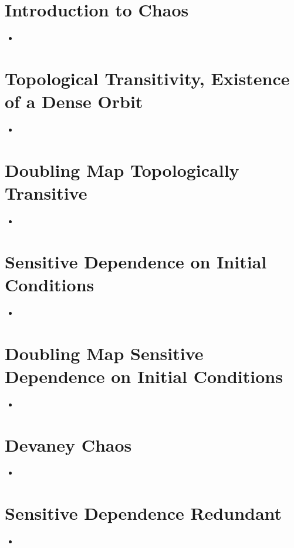 \documentclass{article}
\begin{document}
    \section{Introduction to Chaos}
    \begin{itemize}
        \item
    \end{itemize}

    \section{Topological Transitivity, Existence of a Dense Orbit}
    \begin{itemize}
        \item
    \end{itemize}

    \section{Doubling Map Topologically Transitive}
    \begin{itemize}
        \item
    \end{itemize}

    \section{Sensitive Dependence on Initial Conditions}
    \begin{itemize}
        \item
    \end{itemize}

    \section{Doubling Map Sensitive Dependence on Initial Conditions}
    \begin{itemize}
        \item
    \end{itemize}

    \section{Devaney Chaos}
    \begin{itemize}
        \item
    \end{itemize}

    \section{Sensitive Dependence Redundant}
    \begin{itemize}
        \item
    \end{itemize}
\end{document}
